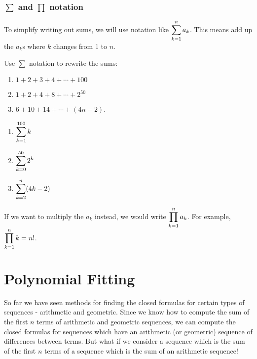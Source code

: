 \documentclass[12pt]{article}
\begin{document}
\subsubsection*{$\sum$ and $\prod$ notation}

To simplify writing out sums, we will use notation like $\displaystyle\sum_{k=1}^n a_k$.  This means add up the $a_k$s where $k$ changes from 1 to $n$.

\begin{example}
  Use $\sum$ notation to rewrite the sums:
  \begin{enumerate}
    \item $1 + 2 + 3 + 4 + \cdots + 100$
    \item $1 + 2 + 4 + 8 + \cdots + 2^{50}$
    \item $6 + 10 + 14 + \cdots + (4n - 2)$.
  \end{enumerate}
  \begin{solution}
  \begin{multicols}{3}
    \begin{enumerate}
      \item $\displaystyle\sum_{k=1}^{100} k$
      \item $\displaystyle\sum_{k=0}^{50} 2^k$
      \item $\displaystyle\sum_{k=2}^{n} (4k -2)$
    \end{enumerate}
    \end{multicols}
  \end{solution}
\end{example}


If we want to multiply the $a_k$ instead, we would write $\displaystyle\prod_{k=1}^n a_k$.  For example, $\displaystyle\prod_{k=1}^n k = n!$.



\section{Polynomial Fitting}

So far we have seen methods for finding the closed formulas for certain types of sequences - arithmetic and geometric.  Since we know how to compute the sum of the first $n$ terms of arithmetic and geometric sequences, we can compute the closed formulas for sequences which have an arithmetic (or geometric) sequence of differences between terms.  But what if we consider a sequence which is the sum of the first $n$ terms of a sequence which is the sum of an arithmetic sequence!
\end{document}
